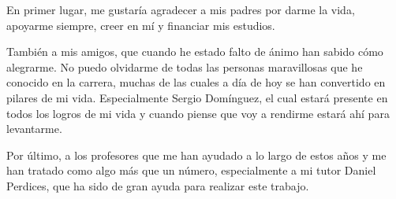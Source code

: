 En primer lugar, me gustaría agradecer a mis padres por darme la vida, apoyarme siempre, creer en mí y financiar mis estudios.

También a mis amigos, que cuando he estado falto de ánimo han sabido cómo alegrarme. No puedo olvidarme de todas las personas maravillosas que he conocido en la carrera, muchas de las cuales a día de hoy se han convertido en pilares de mi vida. Especialmente Sergio Domínguez, el cual estará presente en todos los logros de mi vida y cuando piense que voy a rendirme estará ahí para levantarme.

Por último, a los profesores que me han ayudado a lo largo de estos años y me han tratado como algo más que un número, especialmente a mi tutor Daniel Perdices, que ha sido de gran ayuda para realizar este trabajo.